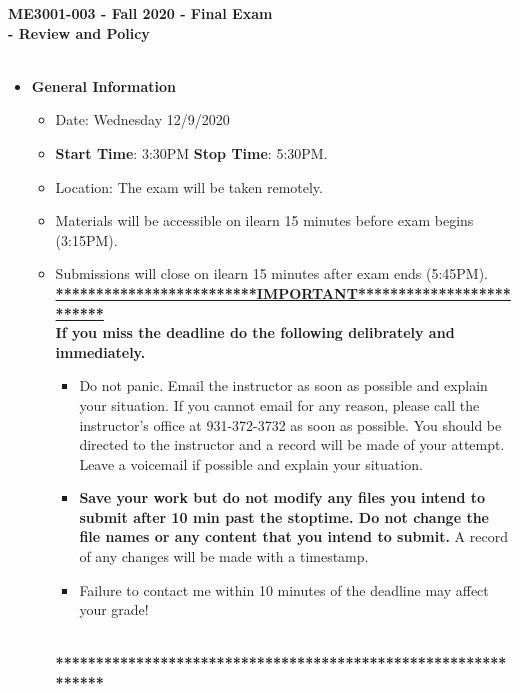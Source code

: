 \documentclass[11pt]{article}
\begin{document}
\textbf{ \LARGE ME3001-003 - Fall 2020 - Final Exam\hspace{2mm}\vspace{3mm}\\ \hspace*{10mm} - Review and Policy  } \\\\

\begin{itemize}
	\item  \textbf{\Large General Information}

	\begin{itemize}

		\item Date: Wednesday 12/9/2020
		\item {\bf Start Time}: 3:30PM {\bf Stop Time}: 5:30PM.
		\item Location: The exam will be taken remotely. 
		 
		\item Materials will be accessible on ilearn 15 minutes before exam begins (3:15PM).
		\item Submissions will close on ilearn 15 minutes after exam ends (5:45PM). \vspace{1mm}\\
		
		{\R  \bf \underline{*************************IMPORTANT*************************}} \vspace{3mm}\\
			  {\R \bf If you miss the deadline do the following delibrately and immediately. }
		\begin{itemize}
			\item Do not panic. Email the instructor as soon as possible and explain your situation. If you cannot email for any reason, please call the instructor's office at 931-372-3732 as soon as possible. You should be directed to the instructor and a record will be made of your attempt. Leave a voicemail if possible and explain your situation.
			\item{\bf  Save your work but do not modify any files you intend to submit after 10 min past the stoptime. Do not change the file names or any content that you intend to submit.} A record of any changes will be made with a timestamp. \vspace{2mm}
			\item {\R Failure to contact me within 10 minutes of the deadline may affect your grade!}
		\end{itemize}
			{\R  \bf \underline{\hspace{140mm}}} \\
			{\R  \bf ***************************************************************} 
	\end{itemize}


\end{itemize}
\end{document}
